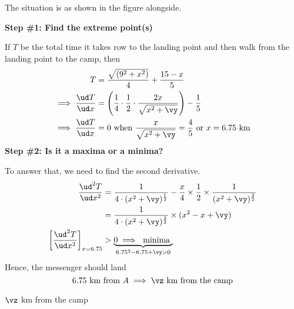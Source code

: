 \begin{solution}[\fullpage]
  The situation is as shown in the figure alongside. 

 \textbf{Step \#1: Find the extreme point(s)} 

 If $T$ be the total time it takes row to the landing point  
 and then walk from the landing point to the camp, then
   \begin{align}
       T &= \dfrac{\sqrt{(\vs^2+x^2)}}{\vr} + \dfrac{\vd-x}{\vw} \\
       \implies \dfrac{\ud T}{\ud x} &= \left( \dfrac{1}{\vr}\cdot\dfrac{1}{2}\cdot\dfrac{2x}{\sqrt{x^2+\vy}}\right) - \dfrac{1}{\vw} \\
       \implies \dfrac{\ud T}{\ud x} &= 0\text{ when } \dfrac{x}{\sqrt{x^2+\vy}} = \dfrac{\vr}{\vw}
       \text{ or } x = \vx\text{ km} 
   \end{align}
   \textbf{Step \#2: Is it a maxima or a minima?}
   
   To answer that, we need to find the second derivative.
   \begin{align}
     \dfrac{\ud^2 T}{\ud x^2} &= \dfrac{1}{\vr\cdot(x^2+\vy)^{\frac{1}{2}}} 
                 - \dfrac{x}{\vr}\times\dfrac{1}{2}\times\dfrac{1}{(x^2+\vy)^{\frac{3}{2}}} \\
                         &= \dfrac{1}{\vr\cdot(x^2+\vy)^{\frac{3}{2}}}\times(x^2-x+\vy) \\
     \left[\dfrac{\ud^2 T}{\ud x^2}\right]_{x=\vx} &> \underbrace{0\implies\text{ minima }}_{\vx^2-\vx + \vy > 0}
   \end{align}
   Hence, the messenger should land 
    \[ \vx\text{ km from } A\implies\vz\text{ km from the camp} \] 
\end{solution}
\ifprintanswers\begin{codex}$\vz$ km from the camp\end{codex}\fi
